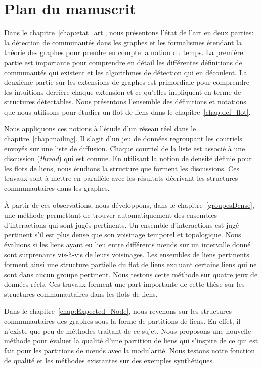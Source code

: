\section*{Plan du manuscrit}


Dans le chapitre~\ref{chap:etat_art}, nous présentons l'état de l'art en deux parties: la détection de communautés dans les graphes et les formalismes étendant la théorie des graphes pour prendre en compte la notion du temps.
La première partie est importante pour comprendre en détail les différentes définitions de communautés qui existent et les algorithmes de détection qui en découlent.
La deuxième partie sur les extensions de graphes est primordiale pour comprendre les intuitions derrière chaque extension et ce qu'elles impliquent en terme de structures détectables.
Nous présentons l'ensemble des définitions et notations que nous utilisons pour étudier un flot de liens dans le chapitre~\ref{chap:def_flot}.

Nous appliquons ces notions à l'étude d'un réseau réel dans le chapitre~\ref{chap:mailing}.
Il s'agit d'un jeu de données regroupant les courriels envoyés sur une liste de diffusion.
Chaque courriel de la liste est associé à une discussion (\emph{thread}) qui est connue.
En utilisant la notion de densité définie pour les flots de liens, nous étudions la structure que forment les discussions.
Ces travaux sont à mettre en parallèle avec les résultats décrivant les structures communautaires dans les graphes.


\`A partir de ces observations, nous développons, dans le chapitre~\ref{groupesDense}, une méthode permettant de trouver automatiquement des ensembles d'interactions qui sont jugés pertinents.
Un ensemble d'interactions est jugé pertinent s’il est plus dense que son voisinage temporel et topologique.
Nous évaluons si les liens ayant eu lieu entre différents n\oe{}uds sur un intervalle donné sont surprenants vis-à-vis de leurs voisinages.
Les  ensembles de liens pertinents forment ainsi une structure partielle du flot de liens excluant certains liens qui ne sont dans aucun groupe pertinent.
Nous testons cette méthode sur quatre jeux de données réels.
Ces travaux forment une part importante de cette thèse sur les structures communautaires dans les flots de liens.

Dans le chapitre~\ref{chap:Expected_Node}, nous revenons sur les structures communautaires des graphes sous la forme de partitions de liens.
En effet, il n'existe que peu de méthodes traitant de ce sujet.
Nous proposons une nouvelle méthode pour évaluer la qualité d'une partition de liens qui s'inspire de ce qui est fait pour les partitions de n\oe{}uds avec la modularité.
Nous testons notre fonction de qualité et les méthodes existantes sur des exemples synthétiques.

